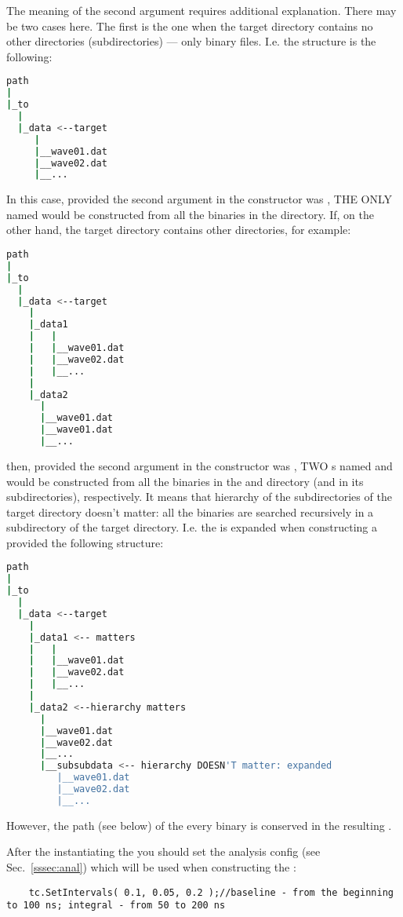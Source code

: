 The meaning of the second argument requires additional explanation. There may be two
cases here. The first is the one when the target directory contains no other directories
(subdirectories) --- only binary files. I.e. the structure is the following:
\begin{lstlisting}[language=bash]
path
|
|_to
  |
  |_data <--target
     |
     |__wave01.dat
     |__wave02.dat
     |__...
\end{lstlisting}
In this case, provided the second argument in the  constructor
was , THE ONLY  named  would be constructed
from all the binaries in the  directory. If, on the other hand, the target
directory contains other directories, for example:
\begin{lstlisting}[language=bash]
path
|
|_to
  |
  |_data <--target
    |
    |_data1
    |   | 
    |   |__wave01.dat
    |   |__wave02.dat
    |   |__...
    |
    |_data2
      |
      |__wave01.dat
      |__wave01.dat
      |__...
\end{lstlisting}
then, provided the second argument in the  constructor
was , TWO s named  and
 would be constructed from all the binaries in the  and
 directory (and in its subdirectories), respectively.
It means that hierarchy of the subdirectories of the target directory doesn't matter:
all the binaries are searched recursively in a subdirectory of the target directory. I.e.
the  is expanded when constructing a  provided the following
structure:
\begin{lstlisting}[language=bash]
path
|
|_to
  |
  |_data <--target
    |
    |_data1 <-- matters
    |   | 
    |   |__wave01.dat
    |   |__wave02.dat
    |   |__...
    |
    |_data2 <--hierarchy matters
      |
      |__wave01.dat
      |__wave02.dat
      |__...
      |__subsubdata <-- hierarchy DOESN'T matter: expanded
         |__wave01.dat
         |__wave02.dat
         |__...
\end{lstlisting}
However, the path (see below) of the every binary is conserved in the resulting
.

After the instantiating the  you should set the analysis config
(see Sec.~\ref{sssec:anal}) which will be used when constructing the :
\begin{lstlisting}
    tc.SetIntervals( 0.1, 0.05, 0.2 );//baseline - from the beginning to 100 ns; integral - from 50 to 200 ns
\end{lstlisting}

